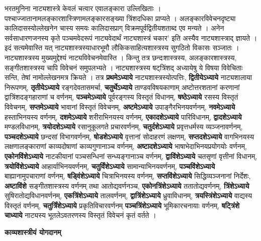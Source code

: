 \documentclass[10pt, a5paper, twoside]{article}
\newcommand{\customparagraph}[1]{
    \noindent \textbf{#1} \par
    \penalty 10000 %
    \vspace{0.1cm plus 0.05cm minus 0.02cm}
    \penalty 10000 %
}
\begin{document}
भरतमुनिना नाट्यशास्त्रे केवलं चत्वार एवालङ्कारा उल्लिखिताः । पश्चाज्जातानामलङ्कारशास्त्रिणामलङ्कारसङ्‌ख्या त्रिंशदधिका प्राप्यते । अलङ्कारविवेचनदृष्ट्या कालिदासस्योल्लेखनेन चास्य समयः कालिदासप्राग् विक्रमपूर्वद्वितीयशताब्द एव मन्यते । अनेन सर्वसाधारणजनस्य कृते पञ्चमवेदरूपं नाट्यवेदार्थं नाट्यशास्त्रं चकार’ इति अस्यैव नाट्यशास्त्राद् ज्ञायते । इदं सत्यमेवास्ति यत् नाट्यशास्त्रस्याधारभूमौ लौकिकसाहित्यशास्त्रस्य सुगठितो विकासः सञ्जातः । नाट्यशास्त्रस्य मुख्यमुद्देश्यं नाट्यविवेचनमेवास्ति । किन्तु तत्र छन्दःशास्त्रस्य, अलङ्कारशास्त्रस्य, सङ्गीतशास्त्रस्य चापि विवेचनं समुपलभ्यते । नाट्यशास्त्रस्य षट्‌त्रिंशद् अध्यायेषु ये विषया विवेचिताः सन्ति, तेषां नामोल्लेखनमत्र क्रियते । तत्र \textbf{प्रथमेऽध्याये} नाट्यशास्त्रस्योत्पत्तिः, \textbf{द्वितीयेऽध्याये} नाट्यशालाया निरूपणम्,  \textbf{तृतीयेऽध्याये} रङ्गदेवतासमर्चा, \textbf{चतुर्थेऽध्याये} ताण्डवविषयकाणाम्  अष्टोत्तरशतानां करणानां द्वात्रिंशदङ्गहाराणां च वर्णनम्, \textbf{पञ्चमेऽध्याये} पूर्वरङ्गस्य विस्तृतं विधानम्, \textbf{षष्ठेऽध्याये} रसस्य विस्तृतं विवेचनम्, \textbf{सप्तमेऽध्याये} भावानां विस्तृतं विवेचनम्, \textbf{अष्टमेऽध्याये} उपाङ्गैरभिनयवर्णनम्, \textbf{नवमेऽध्याये} हस्ताभिनयस्य वर्णनम्, \textbf{दशमेऽध्याये} शरीराभिनयस्य वर्णनम्, \textbf{एकादशेऽध्याये} पारिविधानम्, \textbf{द्वादशेऽध्याये} मण्डलविधानम्, \textbf{त्रयोदशेऽध्याये} रसानुकूलगते प्रचारवर्णनम्, \textbf{चतुर्दशेऽध्याये} प्रवृत्तधर्मस्य व्यञ्जनावर्णनम्, \textbf{पञ्चदशेऽध्याये} छन्दसां विभागवर्णनम्, \textbf{षोडशेऽध्याये} वृत्तानां सोदाहरणं लक्षणम्, \textbf{सप्तदशेऽध्याये} वागभिनयस्य लक्षणालङ्काराणां काव्यदोषाणां काव्यगुणानाञ्च वर्णनम्, \textbf{अष्टादशेऽध्याये} भाषाभेदाभिनयप्रयोगयोः वर्णनम्, \textbf{एकोनविंशेऽध्याये} नाटकीयानां पञ्चसन्धिनां सन्ध्यङ्गानाञ्च वर्णनम्, \textbf{द्वाविंशेऽध्याये} चतसृणां वृत्तीनां विधानम्, \textbf{त्रयोविंशेऽध्याये} आहार्याभिनयवर्णनम्, \textbf{चतुर्विंशेऽध्याये} सामान्याभिनयवर्णनम्, \textbf{पञ्चविंशेऽध्याये} बाह्यानामुपचाराणां वर्णनम्, \textbf{षड्विंशेऽध्याये} चित्राभिनयस्य वर्णनम्, \textbf{सप्तविंशेऽध्याये} सिद्धिव्यञ्जनानां निर्देशः, \textbf{अष्टाविंशे} सङ्गीतशास्त्रस्य वर्णनम् तथा आतोद्यवर्णनञ्च, \textbf{एकोनत्रिंशेऽध्याये} ततातोद्यवर्णनम्, \textbf{त्रिंशेऽध्याये} सुषिरातोद्यविधानवर्णनम्, \textbf{एकत्रिंशेऽध्याये} तालवर्णनम्, \textbf{द्वात्रिंशेऽध्याये} ध्रुवाविधानम्, \textbf{त्रयस्त्रिंशेऽध्याये} वाद्यस्य विस्तृतं वर्णनम्, \textbf{चतुर्त्रिंशेऽध्याये} प्रकृतिविचारवर्णनम् \textbf{पञ्चत्रिंशेऽध्याये} भूमिकारचनायाः वर्णनम्, \textbf{षट्त्रिंशे चाध्याये} नाट्यस्य भूतलेऽवतरणस्य विस्तृतं विवेचनं कृतं वर्तते ।

\customparagraph{\textbf{काव्यशास्त्रीयं योगदानम्}}
\end{document}
